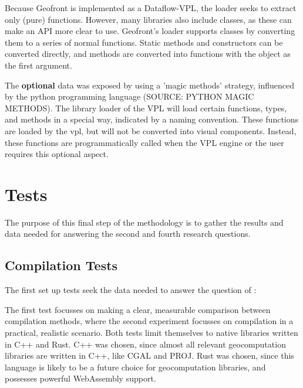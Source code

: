 Because Geofront is implemented as a Dataflow-VPL, the loader seeks to extract only (pure) functions. 
However, many libraries also include classes, as these can make an API more clear to use. 
Geofront's loader supports classes by converting them to a series of normal functions. 
Static methods and constructors can be converted directly, and methods are converted into functions with the object as the first argument.

The \textbf{optional} data was exposed by using a 'magic methods' strategy, influenced by the python programming language (SOURCE: PYTHON MAGIC METHODS). 
The library loader of the VPL will load certain functions, types, and methods in a special way, indicated by a naming convention. 
These functions are loaded by the vpl, but will not be converted into visual components. 
Instead, these functions are programmatically called when the VPL engine or the user requires this optional aspect. 




\section{Tests}
The purpose of this final step of the methodology is to gather the results and data needed for answering the second and fourth research questions. 

\subsection{Compilation Tests}

The first set up tests seek the data needed to answer the question of \mySubRQTwoTitle: \mySubRQTwo

The first test focusses on making a clear, measurable comparison between compilation methods, where the second experiment focusses on compilation in a practical, realistic scenario. 
Both tests limit themselves to native libraries written in C++ and Rust. 
C++ was chosen, since almost all relevant geocomputation libraries are written in C++, like CGAL and PROJ. 
Rust was chosen, since this language is likely to be a future choice for geocomputation libraries, and possesses powerful WebAssembly support. 


